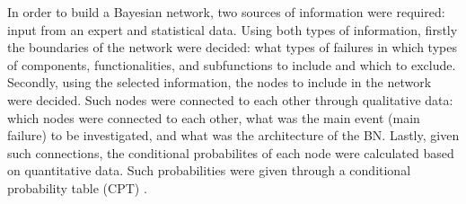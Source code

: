 In order to build a Bayesian network, two sources of information were required: input from an expert and statistical data. Using both types of information, firstly the boundaries of the network were decided: what types of failures in which types of components, functionalities, and subfunctions to include and which to exclude. Secondly, using the selected information, the nodes to include in the network were decided. Such nodes were connected to each other through qualitative data: which nodes were connected to each other, what was the main event (main failure) to be investigated, and what was the architecture of the BN. Lastly, given such connections, the conditional probabilites of each node were calculated based on quantitative data. Such probabilities were given through a conditional probability table (CPT) \cite{langseth2007applications}.